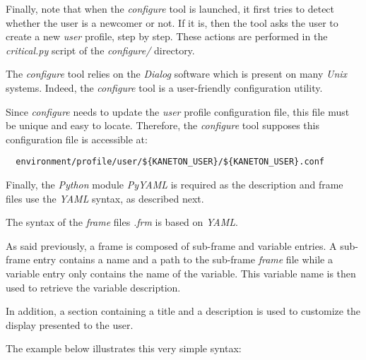 Finally, note that when the \textit{configure} tool is launched, it first
tries to detect whether the user is a newcomer or not. If it is, then the
tool asks the user to create a new \textit{user} profile, step by step. These
actions are performed in the \textit{critical.py} script of the
\textit{configure/} directory.



The \textit{configure} tool relies on the \textit{Dialog} software which
is present on many \textit{Unix} systems. Indeed, the \textit{configure}
tool is a user-friendly configuration utility.

Since \textit{configure} needs to update the \textit{user} profile
configuration file, this file must be unique and easy to locate. Therefore,
the \textit{configure} tool supposes this configuration file is accessible at:

\begin{verbatim}
  environment/profile/user/${KANETON_USER}/${KANETON_USER}.conf
\end{verbatim}

Finally, the \textit{Python} module \textit{PyYAML} is required as the
description and frame files use the \textit{YAML} syntax, as described next.



The syntax of the \textit{frame} files \textit{.frm} is based on \textit{YAML}.

As said previously, a frame is composed of sub-frame and variable entries. A
sub-frame entry contains a name and a path to the sub-frame \textit{frame}
file while a variable entry only contains the name of the variable. This
variable name is then used to retrieve the variable description.

In addition, a section containing a title and a description is used to
customize the display presented to the user.

The example below illustrates this very simple syntax:

